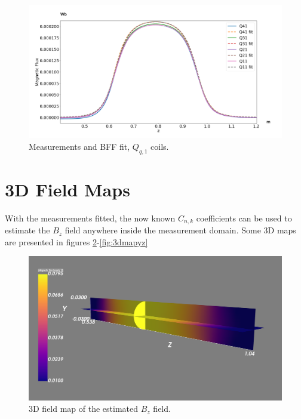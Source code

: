 \begin{figure}[!h]
    \centering
    \includegraphics[width=\linewidth]{figs/Q1fit}
    \caption{Measurements and BFF fit, $Q_{q,1}$ coils.}
    \label{fig:Q1fit}
\end{figure}

\section{3D Field Maps}
With the measurements fitted, the now known $C_{n,k}$
coefficients can be used to estimate the $B_z$ field
anywhere inside the measurement domain. Some 3D maps
are presented in figures \ref{fig:3dmap}-\ref{fig:3dmapyz}

\begin{figure}[!h]
    \centering
    \includegraphics[width=\linewidth]{figs/3ddomain}
    \caption{3D field map of the estimated $B_z$ field.}
    \label{fig:3dmap}
\end{figure}

